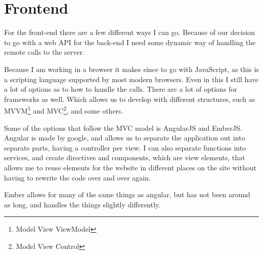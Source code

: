 \begin{table}[h]
  \caption{Pros and cons of different types of databases}
  \label{tab:sedatabse-pro-con}
\end{table}

\section{Frontend}
\label{sec:Frontend}
For the front-end there are a few different ways I can go. Because of our
decision to go with a web API for the back-end I need some dynamic way of
handling the remote calls to the server. 

Because I am working in a browser it makes since to go with JavaScript, as this
is a scripting language supported by most modern browsers. Even in this I still
have a lot of options as to how to handle the calls. There are a lot of options
for frameworks as well. Which allows us to develop with different structures,
such as MVVM\footnote{Model View ViewModel} and MVC\footnote{Model View
  Control}, and some others. 

Some of the options that follow the MVC model is AngularJS and EmberJS. Angular
is made by google\cite{angularjs}, and allows us to separate the application out
into separate parts, having a controller per view. I can also separate functions
into services, and create directives and components, which are view elements,
that allows me to reuse elements for the website in different places on the site
without having to rewrite the code over and over again. 

Ember allows for many of the same things as angular, but has not been around as
long, and handles the things slightly differently\cite{emberjs}. 

